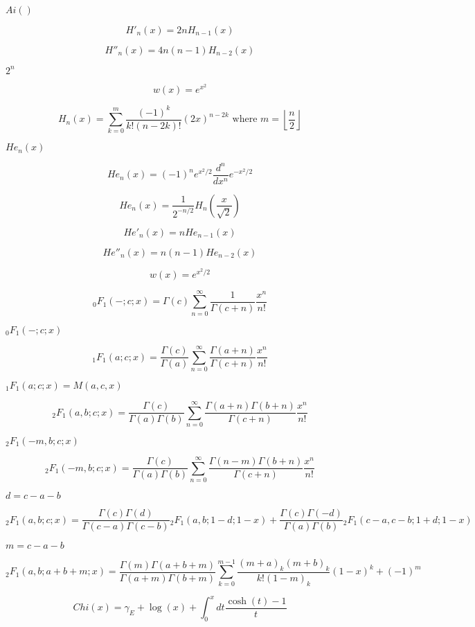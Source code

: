 \documentclass{article}
\begin{document}
$ Ai() $
\pagebreak

\[ H'_n(x) = 2n H_{n-1}(x) \]
\pagebreak

\[ H''_n(x) = 4n(n - 1) H_{n-2}(x) \]
\pagebreak

$ 2^n $
\pagebreak

\[ w(x) = e^{x^2} \]
\pagebreak

\[ H_n(x) = \sum_{k=0}^{m} \frac{(-1)^k}{k!(n-2k)!}(2x)^{n-2k} \mbox{ where } m = \left\lfloor{\frac{n}{2}}\right\rfloor \]
\pagebreak

$ He_n(x) $
\pagebreak

\[ He_n(x) = (-1)^n e^{x^2/2} \frac{d^n}{dx^n} e^{-x^2/2} \]
\pagebreak

\[ He_n(x) = \frac{1}{2^{-n/2}}H_n\left(\frac{x}{\sqrt{2}}\right) \]
\pagebreak

\[ He'_n(x) = n He_{n-1}(x) \]
\pagebreak

\[ He''_n(x) = n(n - 1) He_{n-2}(x) \]
\pagebreak

\[ w(x) = e^{x^2/2} \]
\pagebreak

\[ {}_0F_1(-;c;x) = \Gamma(c) \sum_{n=0}^{\infty} \frac{1}{\Gamma(c+n)} \frac{x^n}{n!} \]
\pagebreak

$ {}_0F_1(-;c;x) $
\pagebreak

\[ {}_1F_1(a;c;x) = \frac{\Gamma(c)}{\Gamma(a)} \sum_{n=0}^{\infty} \frac{\Gamma(a+n)}{\Gamma(c+n)} \frac{x^n}{n!} \]
\pagebreak

$ {}_1F_1(a;c;x) = M(a,c,x) $
\pagebreak

\[ {}_2F_1(a,b;c;x) = \frac{\Gamma(c)}{\Gamma(a)\Gamma(b)} \sum_{n=0}^{\infty} \frac{\Gamma(a+n)\Gamma(b+n)}{\Gamma(c+n)} \frac{x^n}{n!} \]
\pagebreak

$ {}_2F_1(-m,b;c;x) $
\pagebreak

\[ {}_2F_1(-m,b;c;x) = \frac{\Gamma(c)}{\Gamma(a)\Gamma(b)} \sum_{n=0}^{\infty} \frac{\Gamma(n-m)\Gamma(b+n)}{\Gamma(c+n)} \frac{x^n}{n!} \]
\pagebreak

$ d = c - a - b $
\pagebreak

\[ {}_2F_1(a,b;c;x) = \frac{\Gamma(c)\Gamma(d)}{\Gamma(c-a)\Gamma(c-b)} {}_2F_1(a,b;1-d;1-x) + \frac{\Gamma(c)\Gamma(-d)}{\Gamma(a)\Gamma(b)} {}_2F_1(c-a,c-b;1+d;1-x) \]
\pagebreak

$ m = c - a - b $
\pagebreak

\[ {}_2F_1(a,b;a+b+m;x) = \frac{\Gamma(m)\Gamma(a+b+m)}{\Gamma(a+m)\Gamma(b+m)} \sum_{k=0}^{m-1} \frac{(m+a)_k(m+b)_k}{k!(1-m)_k} (1 - x)^k + (-1)^m \]
\pagebreak

\[ Chi(x) = \gamma_E + \log(x) + \int_0^x dt \frac{\cosh(t) - 1}{t} \]
\pagebreak
\end{document}
